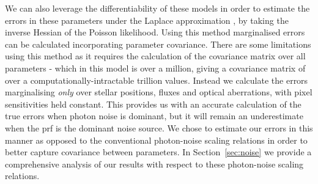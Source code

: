 \documentclass[]{spieman}
\newcommand\jax{\textsc{Jax}\xspace}
\begin{document}
We can also leverage the differentiability of these models in order to estimate the errors in these parameters under the Laplace approximation \cite{bard1974nonlinear}, by taking the inverse Hessian of the Poisson likelihood. Using this method marginalised errors can be calculated incorporating parameter covariance. There are some limitations using this method as it requires the calculation of the covariance matrix over all parameters - which in this model is over a million, giving a covariance matrix of over a computationally-intractable trillion values. Instead we calculate the errors marginalising \textit{only} over stellar positions, fluxes and optical aberrations, with pixel sensitivities held constant. This provides us with an accurate calculation of the true errors when photon noise is dominant, but it will remain an underestimate when the \ac{prf} is the dominant noise source. We chose to estimate our errors in this manner as opposed to the conventional photon-noise scaling relations in order to better capture covariance between parameters. In Section~\ref{sec:noise} we provide a comprehensive analysis of our results with respect to these photon-noise scaling relations.




\end{document}
